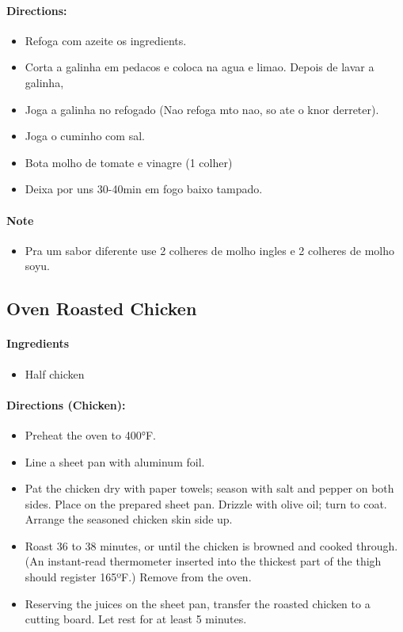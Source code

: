 \documentclass{article}
\begin{document}
\paragraph{Directions:}
\begin{itemize}
	\item Refoga com azeite os ingredients.
	\item Corta a galinha em pedacos e coloca na agua e limao. Depois de lavar a galinha,
	\item Joga a galinha no refogado (Nao refoga mto nao, so ate o knor derreter). 
	\item Joga o cuminho com sal.
	\item Bota molho de tomate e vinagre (1 colher)
	\item Deixa por uns 30-40min em fogo baixo tampado.
\end{itemize}

\paragraph{Note}
\begin{itemize}
	\item Pra um sabor diferente use 2 colheres de molho ingles e 2 colheres de molho soyu.
\end{itemize}

\subsection{Oven Roasted Chicken}

\paragraph{Ingredients}
\begin{itemize}
	\item Half chicken
\end{itemize}

\paragraph{Directions (Chicken):}
\begin{itemize}
	\item Preheat the oven to 400°F. 
	\item Line a sheet pan with aluminum foil. 
	\item Pat the chicken dry with paper towels; season with salt and pepper on
	both sides. Place on the prepared sheet pan. Drizzle with olive oil; turn
	to coat. Arrange the seasoned chicken skin side up. 
	\item Roast 36 to 38 minutes, or until the chicken is browned and cooked
	through. (An instant-read thermometer inserted into the thickest part
	of the thigh should register 165ºF.) Remove from the oven. 
	\item Reserving the juices on the sheet pan, transfer the roasted chicken to a
	cutting board. Let rest for at least 5 minutes.
\end{itemize}
\end{document}

